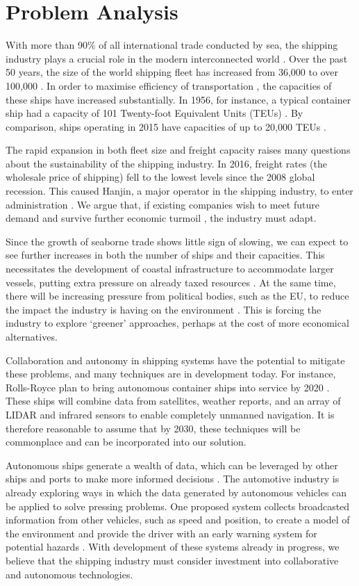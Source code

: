 \section{Problem Analysis}
\label{problem_analysis}

With more than 90\% of all international trade conducted by sea, the shipping industry plays a crucial role in the modern interconnected world \cite{IMOfacts}. Over the past 50 years, the size of the world shipping fleet has increased from 36,000 to over 100,000 \cite{IMOfacts}. In order to maximise efficiency of transportation \cite{sizematters}, the capacities of these ships have increased substantially. In 1956, for instance, a typical container ship had a capacity of 101 Twenty-foot Equivalent Units (TEUs) \cite{ftarticle}. By comparison, ships operating in 2015 have capacities of up to 20,000 TEUs \cite{sizematters}.

The rapid expansion in both fleet size and freight capacity raises many questions about the sustainability of the shipping industry. In 2016, freight rates (the wholesale price of shipping) fell to the lowest levels since the 2008 global recession. This caused Hanjin, a major operator in the shipping industry, to enter administration \cite{globalCrisis}. We argue that, if existing companies wish to meet future demand and survive further economic turmoil \cite{5trends}, the industry must adapt. 

Since the growth of seaborne trade shows little sign of slowing, we can expect to see further increases in both the number of ships and their capacities. This necessitates the development of coastal infrastructure to accommodate larger vessels, putting extra pressure on already taxed resources \cite{ftarticle}. At the same time, there will be increasing pressure from political bodies, such as the EU, to reduce the impact the industry is having on the environment \cite{eureport}. This is forcing the industry to explore `greener’ approaches, perhaps at the cost of more economical alternatives.

Collaboration and autonomy in shipping systems have the potential to mitigate these problems, and many techniques are in development today. For instance, Rolls-Royce plan to bring autonomous container ships into service by 2020 \cite{autoboats}. These ships will combine data from satellites, weather reports, and an array of LIDAR and infrared sensors to enable completely unmanned navigation. It is therefore reasonable to assume that by 2030, these techniques will be commonplace and can be incorporated into our solution.  

Autonomous ships generate a wealth of data, which can be leveraged by other ships and ports to make more informed decisions \cite{5trends}. The automotive industry is already exploring ways in which the data generated by autonomous vehicles can be applied to solve pressing problems. One proposed system collects broadcasted information from other vehicles, such as speed and position, to create a model of the environment and provide the driver with an early warning system for potential hazards \cite{c2c}. With development of these systems already in progress, we believe that the shipping industry must consider investment into collaborative and autonomous technologies.
